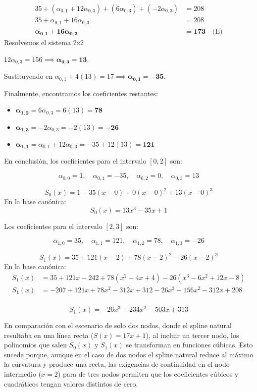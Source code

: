 \documentclass{article}
\begin{document}
\begin{align*}
    35 + (\alpha_{0,1} + 12\alpha_{0,3}) + (6\alpha_{0,3}) + (-2\alpha_{0,3}) &= 208 \\
    35 + \alpha_{0,1} + 16\alpha_{0,3} &= 208 \\
    \boldsymbol{\alpha_{0,1} + 16\alpha_{0,3}} &\boldsymbol{= 173} \quad \text{(E)}
\end{align*}
Resolvemos el sistema 2x2


$12\alpha_{0,3} = 156 \implies \boldsymbol{\alpha_{0,3} = 13}$.

Sustituyendo en  $\alpha_{0,1} + 4(13) = 17 \implies \boldsymbol{\alpha_{0,1} = -35}$.

Finalmente, encontramos los coeficientes restantes:
\begin{itemize}
    \item $\boldsymbol{\alpha_{1,2}} = 6\alpha_{0,3} = 6(13) = \boldsymbol{78}$
    \item $\boldsymbol{\alpha_{1,3}} = -2\alpha_{0,3} = -2(13) = \boldsymbol{-26}$
    \item $\boldsymbol{\alpha_{1,1}} = \alpha_{0,1} + 12\alpha_{0,3} = -35 + 12(13) = \boldsymbol{121}$
\end{itemize}


En conclusión, los coeficientes para el intervalo $[0, 2]$ son:

$$\alpha_{0,0} = 1, \quad \alpha_{0,1} = -35, \quad \alpha_{0,2} = 0, \quad \alpha_{0,3} = 13$$

$$ S_0(x) = 1 - 35(x-0) + 0(x-0)^2 + 13(x-0)^3 $$
En la base canónica:
$$ \boxed{S_0(x) = 13x^3 - 35x + 1} $$

Los coeficientes para el intervalo $[2, 3]$ son:


$$\alpha_{1,0} = 35, \quad \alpha_{1,1} = 121, \quad \alpha_{1,2} = 78, \quad \alpha_{1,3} = -26$$

$$ S_1(x) = 35 + 121(x-2) + 78(x-2)^2 - 26(x-2)^3 $$
En la base canónica:
\begin{align*}
    S_1(x) &= 35 + 121x - 242 + 78(x^2 - 4x + 4) - 26(x^3 - 6x^2 + 12x - 8) \\
    S_1(x) &= -207 + 121x + 78x^2 - 312x + 312 - 26x^3 + 156x^2 - 312x + 208 \\
\end{align*}

$$\boxed{S_1(x) = -26x^3 + 234x^2 - 503x + 313}$$


En comparación con el escenario de solo dos nodos, donde el spline natural resultaba en una línea recta (\(S(x) = 17x + 1\)), al incluir un tercer nodo, los polinomios que salen \(S_0(x)\) y \(S_1(x)\) se transforman en funciones cúbicas. Esto sucede porque, aunque en el caso de dos nodos el spline natural reduce al máximo la curvatura y produce una recta, las exigencias de continuidad en el nodo intermedio (\(x=2\)) para de tres nodos permiten que los coeficientes cúbicos y cuadráticos tengan valores distintos de cero.
\end{document}
